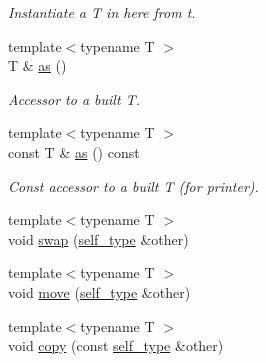 \begin{DoxyCompactItemize}
\begin{DoxyCompactList}\small\item\em Instantiate a {\itshape T} in here from {\itshape t}. \end{DoxyCompactList}\item 
{\footnotesize template$<$typename T $>$ }\\T \& \hyperlink{structEzAquarii_1_1variant_a47128db59e96b94a6e9ccda7c5a64ba7}{as} ()\hypertarget{structEzAquarii_1_1variant_a47128db59e96b94a6e9ccda7c5a64ba7}{}\label{structEzAquarii_1_1variant_a47128db59e96b94a6e9ccda7c5a64ba7}

\begin{DoxyCompactList}\small\item\em Accessor to a built {\itshape T}. \end{DoxyCompactList}\item 
{\footnotesize template$<$typename T $>$ }\\const T \& \hyperlink{structEzAquarii_1_1variant_ad3acf50de2a0c3cc09e97f818f9cfa3f}{as} () const \hypertarget{structEzAquarii_1_1variant_ad3acf50de2a0c3cc09e97f818f9cfa3f}{}\label{structEzAquarii_1_1variant_ad3acf50de2a0c3cc09e97f818f9cfa3f}

\begin{DoxyCompactList}\small\item\em Const accessor to a built {\itshape T} (for printer). \end{DoxyCompactList}\item 
{\footnotesize template$<$typename T $>$ }\\void \hyperlink{structEzAquarii_1_1variant_a13e5d2c240938d776079a84a4d0a2885}{swap} (\hyperlink{structEzAquarii_1_1variant_af94dbfa9a3e7310b9827d20cc65163a8}{self\+\_\+type} \&other)
\item 
{\footnotesize template$<$typename T $>$ }\\void \hyperlink{structEzAquarii_1_1variant_aa40237e6c2cdf568f8098defd28ecbc7}{move} (\hyperlink{structEzAquarii_1_1variant_af94dbfa9a3e7310b9827d20cc65163a8}{self\+\_\+type} \&other)
\item 
{\footnotesize template$<$typename T $>$ }\\void \hyperlink{structEzAquarii_1_1variant_a22bc1304b6bcc561fbb09fe4ee65da40}{copy} (const \hyperlink{structEzAquarii_1_1variant_af94dbfa9a3e7310b9827d20cc65163a8}{self\+\_\+type} \&other)\hypertarget{structEzAquarii_1_1variant_a22bc1304b6bcc561fbb09fe4ee65da40}{}\label{structEzAquarii_1_1variant_a22bc1304b6bcc561fbb09fe4ee65da40}


\end{DoxyCompactItemize}
